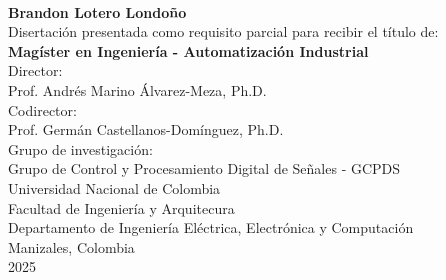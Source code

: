 \begin{center}

  \thispagestyle{empty}
  \vspace*{2cm}

  \begin{spacing}{1.9}
    \textbf{\huge \thesistitlees}\\[1.0cm]
  \end{spacing}

  \Large
  \textbf{Brandon Lotero Londoño}\\[2.0cm]

  \small
  Disertación presentada como requisito parcial para recibir el título de:\\
  \textbf{Magíster en Ingeniería - Automatización Industrial}\\[1cm]

  Director:\\
  Prof. Andrés Marino Álvarez-Meza,
  Ph.D.\\[0.25cm]

  Codirector:\\
  Prof. Germán Castellanos-Domínguez,
  Ph.D.\\[1cm]

  Grupo de investigación:\\
  Grupo de Control y Procesamiento Digital de Señales - GCPDS \\[1cm]

  Universidad Nacional de Colombia\\
  Facultad de Ingeniería y Arquitecura\\
  Departamento de Ingeniería Eléctrica, Electrónica y Computación\\
  Manizales, Colombia\\
  2025\\

\end{center}

\restoregeometry